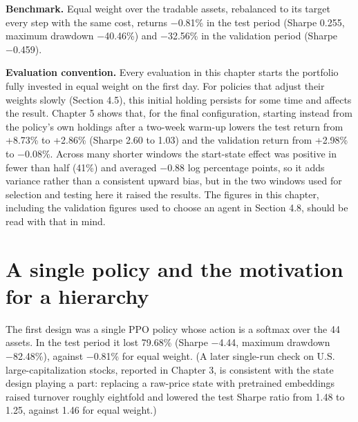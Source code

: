 \documentclass[12pt,a4paper]{report}
\begin{document}
\textbf{Benchmark.} Equal weight over the tradable assets, rebalanced to
its target every step with the same cost, returns −0.81\% in the test
period (Sharpe 0.255, maximum drawdown −40.46\%) and −32.56\% in the
validation period (Sharpe −0.459).

\textbf{Evaluation convention.} Every evaluation in this chapter starts
the portfolio fully invested in equal weight on the first day. For
policies that adjust their weights slowly (Section 4.5), this initial
holding persists for some time and affects the result. Chapter 5 shows
that, for the final configuration, starting instead from the policy's
own holdings after a two-week warm-up lowers the test return from
+8.73\% to +2.86\% (Sharpe 2.60 to 1.03) and the validation return from
+2.98\% to −0.08\%. Across many shorter windows the start-state effect
was positive in fewer than half (41\%) and averaged −0.88 log percentage
points, so it adds variance rather than a consistent upward bias, but in
the two windows used for selection and testing here it raised the
results. The figures in this chapter, including the validation figures
used to choose an agent in Section 4.8, should be read with that in
mind.

\section{A single policy and the motivation for a
hierarchy}\label{a-single-policy-and-the-motivation-for-a-hierarchy}

The first design was a single PPO policy whose action is a softmax over
the 44 assets. In the test period it lost 79.68\% (Sharpe −4.44, maximum
drawdown −82.48\%), against −0.81\% for equal weight. (A later
single-run check on U.S. large-capitalization stocks, reported in
Chapter 3, is consistent with the state design playing a part: replacing
a raw-price state with pretrained embeddings raised turnover roughly
eightfold and lowered the test Sharpe ratio from 1.48 to 1.25, against
1.46 for equal weight.)
\end{document}
